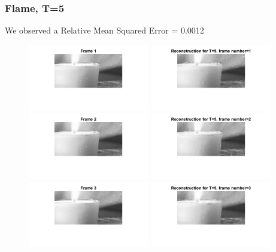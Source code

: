 \documentclass[a4paper,11pt]{article}
\numberwithin{definition}{section}
\numberwithin{mytheorem}{subsection}
\begin{document}
\newpage

\subsubsection{Flame, T=5}

We observed a Relative Mean Squared Error = 0.0012


\begin{figure}[H]
    \centering
    \includegraphics[width=200px]{"fFrame 1.png"}
    \includegraphics[width=200px]{"fReconstruction- T=5, frame number=1.png"}
    \includegraphics[width=200px]{"fFrame 2.png"}
    \includegraphics[width=200px]{"fReconstruction- T=5, frame number=2.png"}
    \includegraphics[width=200px]{"fFrame 3.png"}
    \includegraphics[width=200px]{"fReconstruction- T=5, frame number=3.png"}

\end{figure}
\end{document}
